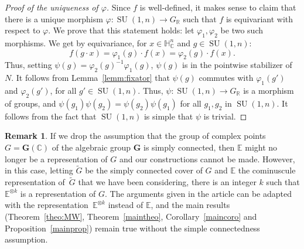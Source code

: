 \documentclass[10pt]{amsart}
\theoremstyle{plain}
\theoremstyle{definition}
\newtheorem{rema}[theo]{Remark}
\DeclareMathOperator{\SU}{SU}
\newcommand{\bC}{\mathbb{C}}
\newcommand{\bE}{\mathbb{E}}
\newcommand{\bR}{\mathbb{R}}
\newcommand{\HC}{{\mathbb{H}^n_\mathbb{C}}}
\newcommand{\bfG}{\boldsymbol{G}}
\begin{document}
\begin{proof}[Proof of the uniqueness of $\varphi$]
Since $f$ is well-defined, it makes sense to claim that there is a unique morphism $\varphi:\SU(1,n) \to G_\bR$
such that $f$ is equivariant with respect to $\varphi$. We prove that this statement holds: let
$\varphi_1,\varphi_2$ be two
such morphisms. We get by equivariance, for $x \in \HC$ and $g \in \SU(1,n)$:
$$
f(g \cdot x) = \varphi_1(g) \cdot f(x) = \varphi_2(g) \cdot f(x).
$$
Thus, setting $\psi(g)=\varphi_2(g)^{-1}\varphi_1(g)$, $\psi(g)$ is in the pointwise stabilizer of $N$. It
follows from Lemma~\ref{lemm:fixator} that $\psi(g)$ commutes with $\varphi_1(g')$
and $\varphi_2(g')$, for all $g'\in\SU(1,n)$. Thus, $\psi:\SU(1,n) \to G_\bR$ is a morphism of groups, and
$\psi(g_1)\psi(g_2)=\psi(g_2)\psi(g_1)$ for all $g_1,g_2$ in $\SU(1,n)$. It follows from the fact
that $\SU(1,n)$ is simple that $\psi$ is trivial.
\end{proof}

\begin{rema}
\label{rema:1-connected}
If we drop the assumption that the group of complex points \hbox{$G=\bfG(\bC)$} of the algebraic
group $\bfG$ is simply connected, then $\bE$ might no longer be a
representation of $G$ and our constructions cannot be made. However, in this case, letting $\tilde
G$ be the simply connected cover of $G$ and $\bE$ the cominuscule representation
of~$\tilde G$ that we have been considering, there is an integer $k$ such that $\bE^{\otimes k}$ is
a representation of $G$. The arguments given in the article can be adapted with the representation~$\bE^{\otimes k}$ instead of $\bE$, and the main results (Theorem~\ref{theo:MW}, Theorem~\ref{maintheo},
Corollary~\ref{maincoro} and Proposition~\ref{mainprop})
remain true without the simple connectedness assumption.
\end{rema}
\end{document}
